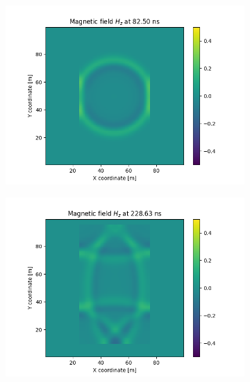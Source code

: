 \documentclass[12pt, oneside]{book}
\begin{document}
\begin{figure}[H]
    \centering
    \begin{subfigure}[b]{0.45\textwidth}
        \centering
        \includegraphics[width=\textwidth]{Imagenes/CFDTD2D_GaussianInstability1.png}
    \end{subfigure}
    \begin{subfigure}[b]{0.45\textwidth}
        \centering
        \includegraphics[width=\textwidth]{Imagenes/CFDTD2D_GaussianInstability2.png}
    \end{subfigure}



\end{figure}
\end{document}
